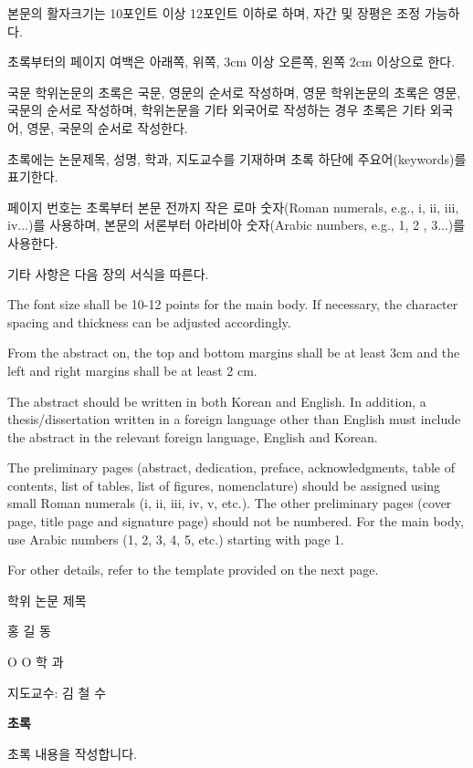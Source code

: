\documentclass[11pt]{report}
\numberwithin{figure}{section}
\theoremstyle{plain}
\theoremstyle{definition}
\theoremstyle{corollary}
\theoremstyle{definition}
\theoremstyle{plain}
\theoremstyle{definition}
\theoremstyle{plain}
\begin{document}
\normalsize
본문의 활자크기는 10포인트 이상 12포인트 이하로 하며, 자간 및 장평은 조정 가능하다.

초록부터의 페이지 여백은 아래쪽, 위쪽, 3cm 이상 오른쪽, 왼쪽 2cm 이상으로 한다.

국문 학위논문의 초록은 국문, 영문의 순서로 작성하며, 영문 학위논문의 초록은 영문, 국문의 순서로 작성하며, 학위논문을 기타 외국어로 작성하는 경우 초록은 기타 외국어, 영문, 국문의 순서로 작성한다.

초록에는 논문제목, 성명, 학과, 지도교수를 기재하며 초록 하단에 주요어(keywords)를 표기한다.

페이지 번호는 초록부터 본문 전까지 작은 로마 숫자(Roman numerals, e.g., i, ii, iii, iv...)를 사용하며, 본문의 서론부터 아라비아 숫자(Arabic numbers, e.g., 1, 2 , 3...)를 사용한다.

기타 사항은 다음 장의 서식을 따른다. 

\bigskip

The font size shall be 10-12 points for the main body. If necessary, the character spacing and thickness can be adjusted accordingly.

From the abstract on, the top and bottom margins shall be at least 3cm and the left and right margins shall be at least 2 cm.

The abstract should be written in both Korean and English. In addition, a thesis/dissertation written in a foreign language other than English must include the abstract in the relevant foreign language, English and Korean. 

The preliminary pages (abstract, dedication, preface, acknowledgments, table of contents, list of tables, list of figures, nomenclature) should be assigned using small Roman numerals (i, ii, iii, iv, v, etc.).
The other preliminary pages (cover page, title page and signature page) should not be numbered.
For the main body, use Arabic numbers (1, 2, 3, 4, 5, etc.) starting with page 1.

For other details, refer to the template provided on the next page.

\newpage
\begin{center}
\Large 학위 논문 제목 

\par\vspace{20pt}

\normalsize 홍 길 동\par
O O 학 과\par
지도교수: 김 철 수

\par\vspace{20pt}

\Large \textbf{초록}
\end{center}
\normalsize
초록 내용을 작성합니다.
\par\vspace{100pt}
\end{document}
